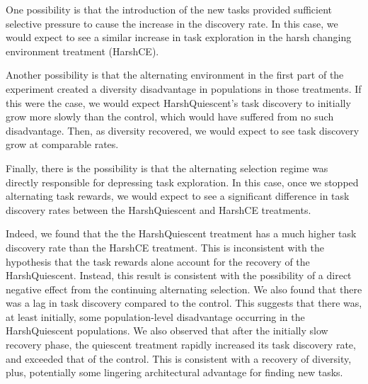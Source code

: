 \documentclass[10pt,letterpaper]{article}
\begin{document}
One possibility is that the introduction of the new tasks provided sufficient selective pressure to cause the increase in the discovery rate. In this case, we would expect to see a similar increase in task exploration in the harsh changing environment treatment (HarshCE). 

Another possibility is that the alternating environment in the first part of the experiment created a diversity disadvantage in populations in those treatments. If this were the case, we would expect HarshQuiescent's task discovery to initially grow more slowly than the control, which would have suffered from no such disadvantage. Then, as diversity recovered, we would expect to see task discovery grow at comparable rates.

Finally, there is the possibility is that the alternating selection regime was directly responsible for depressing task exploration. In this case, once we stopped alternating task rewards, we would expect to see a significant difference in task discovery rates between the HarshQuiescent and HarshCE treatments. 

Indeed, we found that the the HarshQuiescent treatment has a much higher task discovery rate than the HarshCE treatment. This is inconsistent with the hypothesis that the task rewards alone account for the recovery of the HarshQuiescent. Instead, this result is consistent with the possibility of a direct negative effect from the continuing alternating selection. We also found that there was a lag in task discovery compared to the control. This suggests that there was, at least initially, some population-level disadvantage occurring in the HarshQuiescent populations. We also observed that after the initially slow recovery phase, the quiescent treatment rapidly increased its task discovery rate, and exceeded that of the control. This is consistent with a recovery of diversity, plus, potentially some lingering architectural advantage for finding new tasks.
\end{document}
